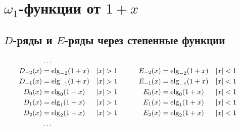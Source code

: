 
\section{$\omega_1$-функции от $ 1 + x $}

\subsection{$D$-ряды и $E$-ряды через степенные функции}

\begin{equation*} \begin{aligned}
&\ldots \\
D_{-2}(x) &= \elg_{-2}(1 + x) &
&|x| > 1 &
&\quad &
E_{-2}(x) &= \elg_{-2}(1 + x) &
&|x| < 1 \\
%
D_{-1}(x) &= \elg_{-1}(1 + x) &
&|x| > 1 &
&\quad &
E_{-1}(x) &= \elg_{-1}(1 + x) &
&|x| < 1 \\
%
D_0(x) &= \elg_0(1 + x) &
&|x| > 1 &
&\quad &
E_0(x) &= \elg_0(1 + x) &
&|x| < 1 \\
%
D_1(x) &= \elg_1(1 + x) &
&|x| > 1 &
&\quad &
E_1(x) &= \elg_1(1 + x) &
&|x| < 1 \\
%
D_2(x) &= \elg_2(1 + x) &
&|x| > 1 &
&\quad &
E_2(x) &= \elg_2(1 + x) &
&|x| < 1 \\
%
&\ldots \\
\end{aligned} \end{equation*}

